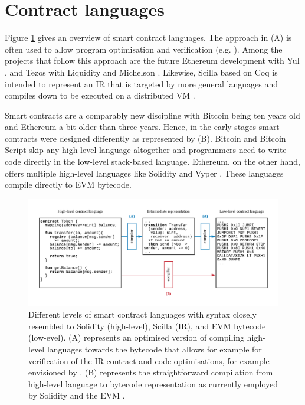 \section{Contract languages}
\label{languages}

Figure \ref{fig:language} gives an overview of smart contract languages.
The approach in (A) is often used to allow program optimisation and verification (e.g. \cite{Lattner2004}). 
Among the projects that follow this approach are the future Ethereum development with Yul \cite{EthereumFoundation2018IULIA}, and Tezos with Liquidity \cite{OCamlProSAS2018} and Michelson \cite{DynamicLedgerSolutions2017}.
Likewise, Scilla based on Coq is intended to represent an IR that is targeted by more general languages and compiles down to be executed on a distributed VM \cite{Sergey2018}.

Smart contracts are a comparably new discipline with Bitcoin being ten years old and Ethereum a bit older than three years.
Hence, in the early stages smart contracts were designed differently as represented by (B).
Bitcoin and Bitcoin Script \cite{BitcoinWiki2018Script} skip any high-level language altogether and programmers need to write code directly in the low-level stack-based language.
Ethereum, on the other hand, offers multiple high-level languages like Solidity \cite{Ethereum2018Solidity} and Vyper \cite{Ethereum2018Vyper}.
These languages compile directly to EVM bytecode. 

\begin{figure}
\label{fig:language}
\includegraphics[width=\textwidth]{fig/Language.pdf}
\caption{Different levels of smart contract languages with syntax closely resembled to Solidity (high-level), Scilla (IR), and EVM bytecode (low-evel). (A) represents an optimised version of compiling high-level languages towards the bytecode that allows for example for verification of the IR contract and code optimisations, for example envisioned by \cite{Sergey2018,OCamlProSAS2018}. (B) represents the straightforward compilation from high-level language to bytecode representation as currently employed by Solidity and the EVM \cite{Ethereum2018Solidity,Wood2014}.}
\end{figure}


